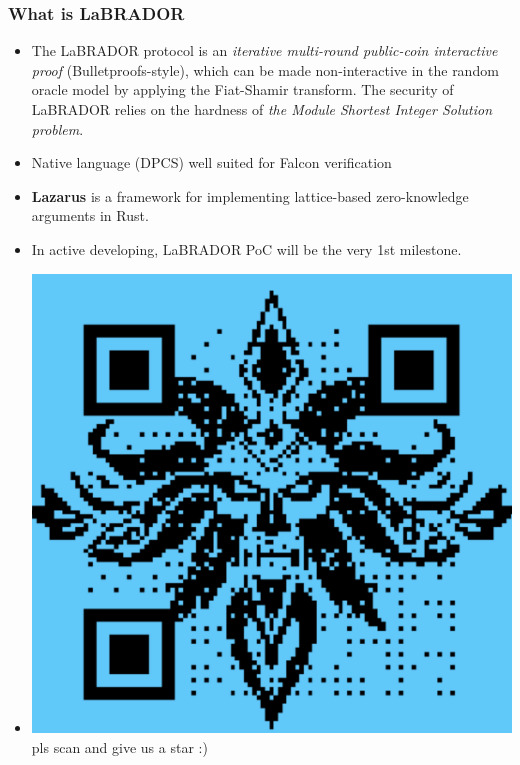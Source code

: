 \documentclass{beamer}
\begin{document}
\begin{frame}
\frametitle{What is LaBRADOR}
\begin{itemize}
	\item The LaBRADOR protocol is an \emph{iterative multi-round public-coin interactive proof} (Bulletproofs-style), which can be made non-interactive in the random oracle model by applying the Fiat-Shamir transform. The security of LaBRADOR relies on the hardness of \emph{the Module Shortest Integer Solution problem}.
	\item Native language (DPCS) well suited for Falcon verification
	\item \textbf{Lazarus} is a framework for implementing lattice-based zero-knowledge arguments in Rust. 
	\item In active developing, LaBRADOR PoC will be the very 1st milestone.
	\item \includegraphics[scale=0.2]{lazarus-repo.png}  pls scan and give us a star :)
\end{itemize}

\end{frame}
\end{document}
